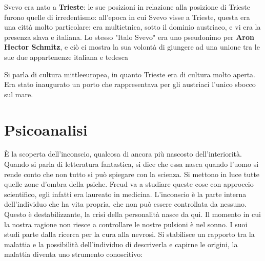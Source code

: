 Svevo era nato a \textbf{Trieste}: le sue posizioni in relazione alla posizione di Trieste furono quelle di irredentismo: all'epoca in cui Svevo visse a Trieste, questa era una città molto particolare: era multietnica, sotto il dominio austriaco, e vi era la presenza slava e italiana. Lo stesso "Italo Svevo" era uno pseudonimo per \textbf{Aron Hector Schmitz}, e ciò ci mostra la sua volontà di giungere ad una unione tra le sue due appartenenze italiana e tedesca

Si parla di cultura mittleeuropea, in quanto Trieste era di cultura molto aperta. Era stato inaugurato un porto che rappresentava per gli austriaci l'unico sbocco sul mare.

\section{Psicoanalisi}


È la scoperta dell’inconscio, qualcosa di ancora più nascosto dell’interiorità.
Quando si parla di letteratura fantastica, si dice che essa nasca quando l’uomo si rende conto che non tutto si può spiegare con la scienza. Si mettono in luce tutte quelle zone d’ombra della psiche.
Freud va a studiare queste cose con approccio scientifico, egli infatti era laureato in medicina.
L’inconscio è la parte interna dell’individuo che ha vita propria, che non può essere controllata da nessuno. Questo è destabilizzante, la crisi della personalità nasce da qui.
Il momento in cui la nostra ragione non riesce a controllare le nostre pulsioni è nel sonno.
I suoi studi parte dalla ricerca per la cura alla nevrosi. Si stabilisce un rapporto tra la malattia e la possibilità dell’individuo di descriverla e capirne le origini, la malattia diventa uno strumento conoscitivo:


